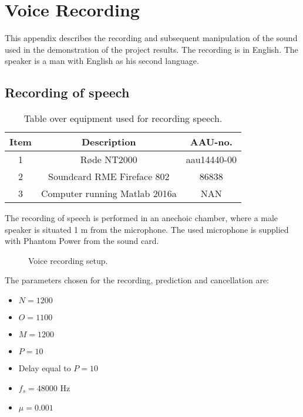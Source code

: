 \section{Voice Recording}
This appendix describes the recording and subsequent manipulation of the sound used in the demonstration of the project results. The recording is in English. The speaker is a man with English as his second language. 

\subsection{Recording of speech}
\begin{table}[H]
	\centering
	\begin{tabular}{ c c c } \toprule
		{Item}	& {Description} 						& {AAU-no}. \\ \bottomrule 
		1	& Røde NT2000 	& aau14440-00	\\
		2	& Soundcard RME Fireface 802	& 86838 		\\
		3	& Computer running Matlab 2016a	 & 	NAN	\\
		\bottomrule
	\end{tabular}
	\caption{Table over equipment used for recording speech.}
	\label{tab:VoiceRec}
\end{table}
The recording of speech is performed in an anechoic chamber, where a male speaker is situated 1 m from the microphone. The used microphone is supplied with Phantom Power from the sound card. \\ 


\begin{figure}[H]
	\centering
	\caption{Voice recording setup.}
	\label{fig:VoiceRecording}
\end{figure}

The parameters chosen for the recording, prediction and cancellation are:
\begin{itemize}
	\item $N=1200$
	\item $O=1100$
	\item $M=1200$
	\item $P=10$
	\item Delay equal to $P=10$
	\item $f_s =48000$ Hz
	\item $\mu=0.001$
\end{itemize}


